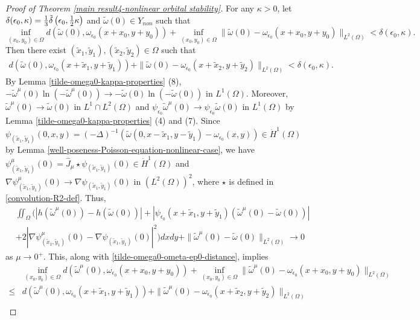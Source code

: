 \documentclass[1 [leqno, 11pt]{amsart}
\numberwithin{equation}{section}
\let\ep=\epsilon
\begin{document}
\begin{CJK*}{GBK}{song}
\begin{proof}[Proof of  Theorem \ref{main result4-nonlinear orbital stability}]
For any $\kappa>0$, let $\delta(\ep_0,\kappa)={1\over3}\tilde\delta\left(\ep_0,{1\over2}\kappa\right)$ and $\tilde \omega(0)\in Y_{non}$ such that
$$\inf_{(x_0,y_0)\in\Omega} d(\tilde \omega(0),\omega_{\ep_0}(x+x_0,y+y_0))+\inf_{(x_0,y_0)\in\Omega}\|\tilde \omega(0)-\omega_{\ep_0}(x+x_0,y+y_0)\|_{L^2(\Omega)}<\delta(\ep_0,\kappa).$$
Then there exist $(\tilde x_1, \tilde y_1), (\tilde x_2,\tilde y_2)\in\Omega$ such that
\begin{align}\label{tilde-omega0-ometa-ep0-distance}
 d(\tilde \omega(0),\omega_{\ep_0}(x+\tilde x_1,y+\tilde y_1))+\|\tilde \omega(0)-\omega_{\ep_0}(x+\tilde x_2,y+\tilde y_2)\|_{L^2(\Omega)}<\delta(\ep_0,\kappa).
\end{align}
By Lemma \ref{tilde-omega0-kappa-properties} (8),  $-\tilde \omega^\mu(0)\ln(-\tilde \omega^\mu(0))\to-\tilde \omega(0)\ln(-\tilde\omega(0))$ in $L^1(\Omega)$. Moreover, $\tilde \omega^\mu(0)\to \tilde \omega(0)$ in $L^1\cap L^2(\Omega)$ and $\psi_{\ep_0}\tilde \omega^\mu(0)\to\psi_{\ep_0}\tilde \omega(0)$ in $L^1(\Omega)$ by Lemma \ref{tilde-omega0-kappa-properties} (4) and (7). Since $\psi_{(\tilde x_1,\tilde y_1)}(0,x,y)=(-\Delta)^{-1}(\tilde \omega(0,x-\tilde x_1,y-\tilde y_1)-\omega_{\ep_0}(x,y))\in \dot{H}^1(\Omega)$ by Lemma \ref{well-poseness-Poisson-equation-nonlinear-case}, we have $\psi_{(\tilde x_1,\tilde y_1)}^\mu(0)=\hat J_{\mu}\star\psi_{(\tilde x_1,\tilde y_1)}(0)\in\dot{H}^1(\Omega)$ and $ \nabla\psi_{(\tilde x_1,\tilde y_1)}^\mu(0)\to\nabla\psi_{(\tilde x_1,\tilde y_1)}(0)$ in $(L^2(\Omega))^2$, where $\star$  is defined in \eqref{convolution-R2-def}. Thus,
\begin{align*}
&\iint_\Omega\bigg(|h(\tilde \omega^\mu(0))-h(\tilde \omega(0))|+|\psi_{\ep_0}(x+\tilde x_1,y+\tilde y_1)(\tilde \omega^\mu(0)-\tilde \omega(0))|\\
&+2|\nabla\psi_{(\tilde x_1,\tilde y_1)}^\mu(0)-\nabla\psi_{(\tilde x_1,\tilde y_1)}(0)|^2\bigg)dxdy
+
\|\tilde \omega^\mu(0)- \tilde \omega(0)\|_{L^2(\Omega)}\to0
\end{align*}
as $\mu\to0^+$. This, along with \eqref{tilde-omega0-ometa-ep0-distance}, implies
\begin{align*}
&\inf_{(x_0,y_0)\in\Omega} d(\tilde \omega^\mu(0),\omega_{\ep_0}(x+x_0,y+y_0))+\inf_{(x_0,y_0)\in\Omega}\|\tilde \omega^\mu(0)-\omega_{\ep_0}(x+x_0,y+y_0)\|_{L^2(\Omega)}\\
\leq &d(\tilde \omega^\mu(0),\omega_{\ep_0}(x+\tilde x_1,y+\tilde y_1))+\|\tilde \omega^\mu(0)-\omega_{\ep_0}(x+\tilde x_2,y+\tilde y_2)\|_{L^2(\Omega)}\\

\end{align*}
\end{proof}
\end{CJK*}
\end{document}

